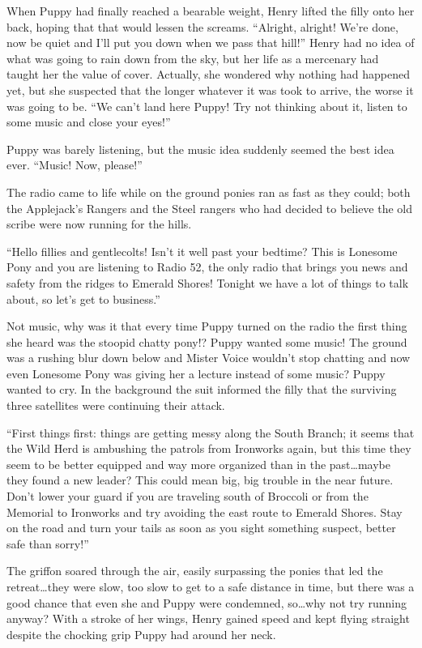 When Puppy had finally reached a bearable weight, Henry lifted the filly onto her back, hoping that that would lessen the screams. ``Alright, alright! We're done, now be quiet and I'll put you down when we pass that hill!'' Henry had no idea of what was going to rain down from the sky, but her life as a mercenary had taught her the value of cover. Actually, she wondered why nothing had happened yet, but she suspected that the longer whatever it was took to arrive, the worse it was going to be. ``We can't land here Puppy! Try not thinking about it, listen to some music and close your eyes!''

Puppy was barely listening, but the music idea suddenly seemed the best idea ever. ``Music! Now, please!''

The radio came to life while on the ground ponies ran as fast as they could; both the Applejack's Rangers and the Steel rangers who had decided to believe the old scribe were now running for the hills.

``{\rt Hello fillies and gentlecolts! Isn't it well past your bedtime? This is Lonesome Pony and you are listening to Radio 52, the only radio that brings you news and safety from the ridges to Emerald Shores! Tonight we have a lot of things to talk about, so let's get to business.}''

Not music, why was it that every time Puppy turned on the radio the first thing she heard was the stoopid chatty pony!? Puppy wanted some music! The ground was a rushing blur down below and Mister Voice wouldn't stop chatting and now even Lonesome Pony was giving her a lecture instead of some music? Puppy wanted to cry. In the background the suit informed the filly that the surviving three satellites were continuing their attack.

``{\rt First things first: things are getting messy along the South Branch; it seems that the Wild Herd is ambushing the patrols from Ironworks again, but this time they seem to be better equipped and way more organized than in the past\dots maybe they found a new leader? This could mean big, big trouble in the near future. Don't lower your guard if you are traveling south of Broccoli or from the Memorial to Ironworks and try avoiding the east route to Emerald Shores. Stay on the road and turn your tails as soon as you sight something suspect, better safe than sorry!}''

The griffon soared through the air, easily surpassing the ponies that led the retreat\dots they were slow, too slow to get to a safe distance in time, but there was a good chance that even she and Puppy were condemned, so\dots why not try running anyway? With a stroke of her wings, Henry gained speed and kept flying straight despite the chocking grip Puppy had around her neck.

